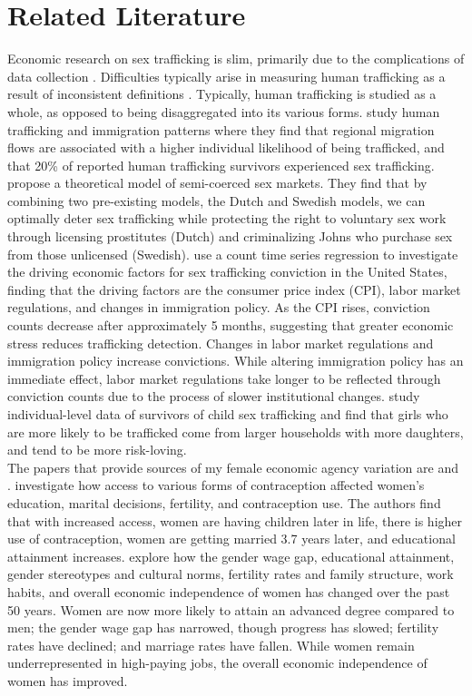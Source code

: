 \documentclass[12pt]{article}
\begin{document}
\section{Related Literature}
Economic research on sex trafficking is slim, primarily due to the complications of data collection \citep{Kristiina}. Difficulties typically arise in measuring human trafficking as a result of inconsistent definitions \citep{Hanson}. Typically, human trafficking is studied as a whole, as opposed to being disaggregated into its various forms. \cite{omar} study human trafficking and immigration patterns where they find that regional migration flows are associated with a higher individual likelihood of being trafficked, and that 20\% of reported human trafficking survivors experienced sex trafficking. \cite{leeandpersson} propose a theoretical model of semi-coerced sex markets. They find that by combining two pre-existing models, the Dutch and Swedish models, we can optimally deter sex trafficking while protecting the right to voluntary sex work through licensing prostitutes (Dutch) and criminalizing Johns who purchase sex from those unlicensed (Swedish). \cite{Jang} use a count time series regression to investigate the driving economic factors for sex trafficking conviction in the United States, finding that the driving factors are the consumer price index (CPI), labor market regulations, and changes in immigration policy. As the CPI rises, conviction counts decrease after approximately 5 months, suggesting that greater economic stress reduces trafficking detection. Changes in labor market regulations and immigration policy increase convictions. While altering immigration policy has an immediate effect, labor market regulations take longer to be reflected through conviction counts due to the process of slower institutional changes. \cite{Nyqviststiina} study individual-level data of survivors of child sex trafficking and find that girls who are more likely to be trafficked come from larger households with more daughters, and tend to be more risk-loving. \\
\indent The papers that provide sources of my female economic agency variation are \cite{baileyandlindo} and \cite{baileyanddiprete}. \cite{baileyandlindo} investigate how access to various forms of contraception affected women’s education, marital decisions, fertility, and contraception use. The authors find that with increased access, women are having children later in life, there is higher use of contraception, women are getting married 3.7 years later, and educational attainment increases. \cite{baileyanddiprete} explore how the gender wage gap, educational attainment, gender stereotypes and cultural norms, fertility rates and family structure, work habits, and overall economic independence of women has changed over the past 50 years. Women are now more likely to attain an advanced degree compared to men; the gender wage gap has narrowed, though progress has slowed; fertility rates have declined; and marriage rates have fallen. While women remain underrepresented in high-paying jobs, the overall economic independence of women has improved. \\
\end{document}
